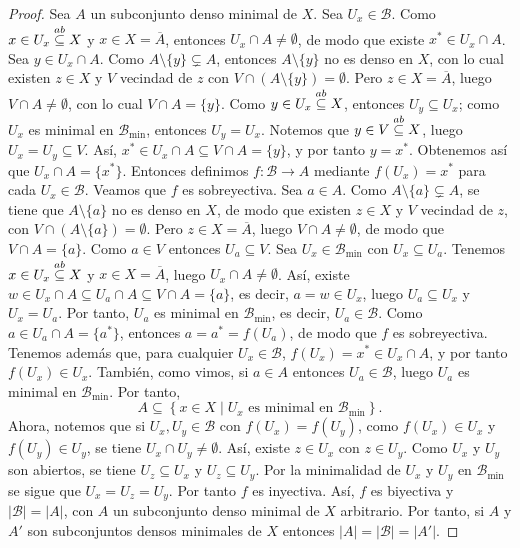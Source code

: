 \begin{proof}
   Sea $A$ un subconjunto denso minimal de $X$. Sea $U_x\in\mathcal{B}$. Como $x\in U_x\stackrel{ab}{\subseteq} X$ y $x\in X=\overline{A}$, entonces $U_x\cap A\ne\emptyset$, de modo que existe $x^*\in U_x\cap A$. Sea $y\in U_x\cap A$. Como $A\setminus\{y\}\subsetneq A$, entonces $A\setminus\{y\}$ no es denso en $X$, con lo cual existen $z\in X$ y $V$ vecindad de $z$ con $V\cap\left( A\setminus\{y\}\right)=\emptyset$. Pero $z\in X=\overline{A}$, luego $V\cap A\ne\emptyset$, con lo cual $V\cap A=\{y\}$. Como $y\in U_x\stackrel{ab}{\subseteq} X$, entonces $U_y\subseteq U_x$; como $U_x$ es minimal en $\mathcal{B}_{\min}$, entonces $U_y=U_x$. Notemos que $y\in V\stackrel{ab}{\subseteq} X$, luego $U_x=U_y\subseteq V$. Así, $x^*\in U_x\cap A\subseteq V\cap A=\{y\}$, y por tanto $y=x^*$. Obtenemos así que $U_x\cap A=\{x^*\}$. Entonces definimos $f:\mathcal{B}\to A$ mediante $f(U_x)=x^*$ para cada $U_x\in\mathcal{B}$. Veamos que $f$ es sobreyectiva. Sea $a\in A$. Como $A\setminus\{a\}\subsetneq A$, se tiene que $A\setminus\{a\}$ no es denso en $X$, de modo que existen $z\in X$ y $V$ vecindad de $z$, con $V\cap\left( A\setminus\{a\}\right)=\emptyset$. Pero $z\in X=\overline{A}$, luego $V\cap A\ne\emptyset$, de modo que $V\cap A=\{a\}$. Como $a\in V$ entonces $U_a\subseteq V$. Sea $U_x\in\mathcal{B}_{\min}$ con $U_x\subseteq U_a$. Tenemos $x\in U_x\stackrel{ab}{\subseteq} X$ y $x\in X=\overline{A}$, luego $U_x\cap A\ne\emptyset$. Así, existe $w\in U_x\cap A\subseteq U_a\cap A\subseteq V\cap A=\{a\}$, es decir, $a=w\in U_x$, luego $U_a\subseteq U_x$ y $U_x=U_a$. Por tanto, $U_a$ es minimal en $\mathcal{B}_{\min}$, es decir, $U_a\in\mathcal{B}$. Como $a\in U_a\cap A=\{a^*\}$, entonces $a=a^*=f(U_a)$, de modo que $f$ es sobreyectiva. Tenemos además que, para cualquier $U_x\in\mathcal{B}$, $f(U_x)=x^*\in U_x\cap A$, y por tanto $f(U_x)\in U_x$. También, como vimos, si $a\in A$ entonces $U_a\in\mathcal{B}$, luego $U_a$ es minimal en $\mathcal{B}_{\min}$. Por tanto,
   $$
   A\subseteq\left\lbrace x\in X\mid U_x\text{ es minimal en }\mathcal{B}_{\min}\right\rbrace.
   $$
   Ahora, notemos que si $U_x,U_y\in\mathcal{B}$ con $f(U_x)=f(U_y)$, como $f(U_x)\in U_x$ y $f(U_y)\in U_y$, se tiene $U_x\cap U_y\ne\emptyset$. Así, existe $z\in U_x$ con $z\in U_y$. Como $U_x$ y $U_y$ son abiertos, se tiene $U_z\subseteq U_x$ y $U_z\subseteq U_y$. Por la minimalidad de $U_x$ y $U_y$ en $\mathcal{B}_{\min}$ se sigue que $U_x=U_z=U_y$. Por tanto $f$ es inyectiva. Así, $f$ es biyectiva y $|\mathcal{B}|=|A|$, con $A$ un subconjunto denso minimal de $X$ arbitrario. Por tanto, si $A$ y $A'$ son subconjuntos densos minimales de $X$ entonces $|A|=|\mathcal{B}|=|A'|$.
\end{proof}
